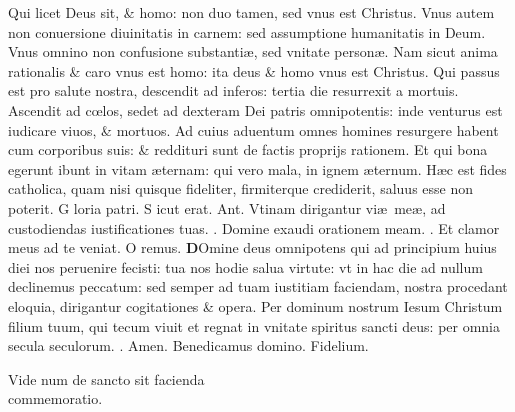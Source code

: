 \documentclass[a5paper,10pt]{book}
\def\ae{æ}
\def\oe{œ}
\begin{document}
\begin{multicols*}{2}
\newline \color{red} Q\color{black}ui licet Deus sit, \& homo: non duo tamen, sed vnus est Christus.
\newline \color{red} V\color{black}nus autem non conuersione diuinitatis in carnem: sed assumptione humanitatis in Deum.
\newline \color{red} V\color{black}nus omnino non confusione substanti\ae , sed vnitate person\ae .
\newline \color{red} N\color{black}am sicut anima rationalis \& caro vnus est homo: ita deus \& homo vnus est Christus.
\newline \color{red} Q\color{black}ui passus est pro salute nostra, descendit ad inferos: tertia die resurrexit a mortuis.
\newline \color{red} A\color{black}scendit ad c\oe los, sedet ad dexteram Dei patris omnipotentis: inde venturus est iudicare viuos, \& mortuos.
\newline \color{red} A\color{black}d cuius aduentum omnes homines resurgere habent cum corporibus suis: \& reddituri sunt de factis proprijs rationem.
\newline \color{red} E\color{black}t qui bona egerunt ibunt in vitam \ae ternam: qui vero mala, in ignem \ae ternum.
\newline \color{red} H\color{black}\ae c est fides catholica, quam nisi quisque fideliter, firmiterque crediderit, saluus esse non poterit.
\newline \color{red} G\color{black} loria patri. \color{red} S\color{black} icut erat. \color{red} Ant. \color{black} Vtinam dirigantur vi\ae \ me\ae , ad custodiendas iustificationes tuas. \color{red} \Vbar . \color{black} Domine exaudi orationem meam. \color{red} \Rbar . \color{black} Et clamor meus ad te veniat. \quad \color{red} O\color{black} remus.
\lettrine[lines=2]{\bfseries \color{red} D}{}Omine deus omnipotens qui ad principium huius diei nos peruenire fecisti: tua nos hodie salua virtute: vt in hac die ad nullum declinemus peccatum: sed semper ad tuam iustitiam faciendam, nostra procedant eloquia, dirigantur cogitationes \& opera. Per dominum nostrum Iesum Christum filium tuum, qui tecum viuit et regnat in vnitate spiritus sancti deus: per omnia secula seculorum. \color{red} \Rbar . \color{black} Amen. Benedicamus domino. Fidelium.
\vspace{-1em}
\begin{center} \color{red}
Vide num de sancto sit facienda\\commemoratio.

\end{center}
\end{multicols*}
\end{document}
